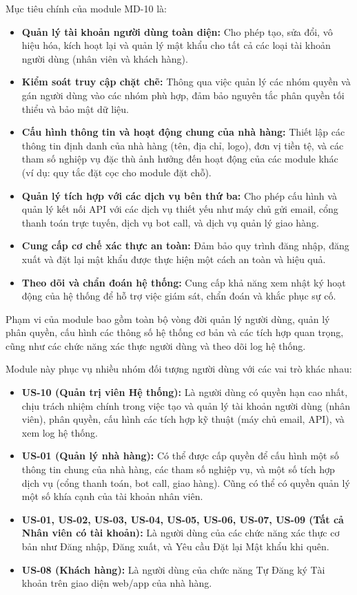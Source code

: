 \label{sssec:md10_objectives_scope_full}
Mục tiêu chính của module MD-10 là:
\begin{itemize}
    \item \textbf{Quản lý tài khoản người dùng toàn diện:} Cho phép tạo, sửa đổi, vô hiệu hóa, kích hoạt lại và quản lý mật khẩu cho tất cả các loại tài khoản người dùng (nhân viên và khách hàng).
    \item \textbf{Kiểm soát truy cập chặt chẽ:} Thông qua việc quản lý các nhóm quyền và gán người dùng vào các nhóm phù hợp, đảm bảo nguyên tắc phân quyền tối thiểu và bảo mật dữ liệu.
    \item \textbf{Cấu hình thông tin và hoạt động chung của nhà hàng:} Thiết lập các thông tin định danh của nhà hàng (tên, địa chỉ, logo), đơn vị tiền tệ, và các tham số nghiệp vụ đặc thù ảnh hưởng đến hoạt động của các module khác (ví dụ: quy tắc đặt cọc cho module đặt chỗ).
    \item \textbf{Quản lý tích hợp với các dịch vụ bên thứ ba:} Cho phép cấu hình và quản lý kết nối API với các dịch vụ thiết yếu như máy chủ gửi email, cổng thanh toán trực tuyến, dịch vụ bot call, và dịch vụ quản lý giao hàng.
    \item \textbf{Cung cấp cơ chế xác thực an toàn:} Đảm bảo quy trình đăng nhập, đăng xuất và đặt lại mật khẩu được thực hiện một cách an toàn và hiệu quả.
    \item \textbf{Theo dõi và chẩn đoán hệ thống:} Cung cấp khả năng xem nhật ký hoạt động của hệ thống để hỗ trợ việc giám sát, chẩn đoán và khắc phục sự cố.
\end{itemize}
Phạm vi của module bao gồm toàn bộ vòng đời quản lý người dùng, quản lý phân quyền, cấu hình các thông số hệ thống cơ bản và các tích hợp quan trọng, cũng như các chức năng xác thực người dùng và theo dõi log hệ thống.

\label{sssec:md10_primary_users_full}
Module này phục vụ nhiều nhóm đối tượng người dùng với các vai trò khác nhau:
\begin{itemize}
    \item \textbf{US-10 (Quản trị viên Hệ thống):} Là người dùng có quyền hạn cao nhất, chịu trách nhiệm chính trong việc tạo và quản lý tài khoản người dùng (nhân viên), phân quyền, cấu hình các tích hợp kỹ thuật (máy chủ email, API), và xem log hệ thống.
    \item \textbf{US-01 (Quản lý nhà hàng):} Có thể được cấp quyền để cấu hình một số thông tin chung của nhà hàng, các tham số nghiệp vụ, và một số tích hợp dịch vụ (cổng thanh toán, bot call, giao hàng). Cũng có thể có quyền quản lý một số khía cạnh của tài khoản nhân viên.
    \item \textbf{US-01, US-02, US-03, US-04, US-05, US-06, US-07, US-09 (Tất cả Nhân viên có tài khoản):} Là người dùng của các chức năng xác thực cơ bản như Đăng nhập, Đăng xuất, và Yêu cầu Đặt lại Mật khẩu khi quên.
    \item \textbf{US-08 (Khách hàng):} Là người dùng của chức năng Tự Đăng ký Tài khoản trên giao diện web/app của nhà hàng.
\end{itemize}


